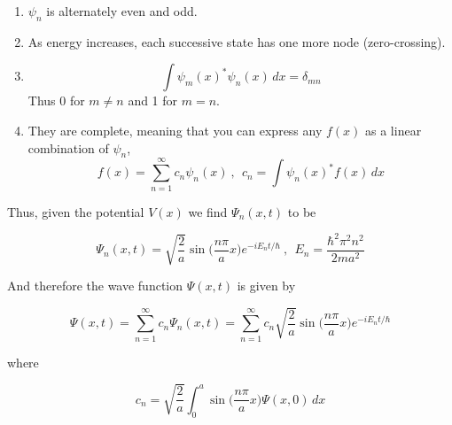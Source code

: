 \documentclass[a4paper]{article}
\begin{document}
\begin{enumerate}
	\item $\psi_n$ is alternately even and odd.
	\item As energy increases, each successive state has one more node (zero-crossing).
	\item $$\int\psi_m(x)^*\psi_n(x)\,dx=\delta_{mn}$$ Thus 0 for $m\not=n$ and 1 for $m=n$.
	\item They are complete, meaning that you can express any $f(x)$ as a linear combination of $\psi_n$, $$f(x)=\sum_{n=1}^{\infty}c_n\psi_n(x)\ , \ \ c_n=\int\psi_n(x)^*f(x)\,dx$$
\end{enumerate}

Thus, given the potential $V(x)$ we find $\Psi_n(x, t)$ to be

\begin{equation}
	\Psi_n(x,t)=\sqrt{\frac{2}{a}}\sin\bigg(\frac{n\pi}{a}x\bigg)e^{-iE_nt/\hbar}\ , \ \ E_n=\frac{\hbar^2\pi^2n^2}{2ma^2}
\end{equation}

And therefore the wave function $\Psi(x, t)$ is given by

\begin{equation}
\Psi(x,t)=\sum_{n=1}^{\infty}c_n\Psi_n(x,t)=\sum_{n=1}^{\infty}c_n\sqrt{\frac{2}{a}}\sin\bigg(\frac{n\pi}{a}x\bigg)e^{-iE_nt/\hbar}
\end{equation}

where

\begin{equation}
	c_n=\sqrt{\frac{2}{a}}\int_0^a\sin\bigg(\frac{n\pi}{a}x\bigg)\Psi(x,0)\,dx
\end{equation}
\end{document}
